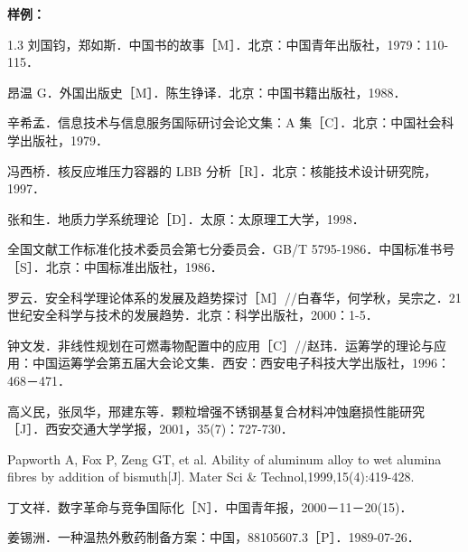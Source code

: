 \documentclass[UTF8, scheme=chinese, openany, oneside]{ctexbook}
\begin{document}
\noindent {}\textbf{样例：}

\vspace{0.3cm}
\begin{spacing}{1.3}
\noindent [1] 刘国钧，郑如斯．中国书的故事［M］．北京：中国青年出版社，1979：110-115．

\vspace{0.2cm}
\noindent [2] 昂温 G．外国出版史［M］．陈生铮译．北京：中国书籍出版社，1988．

\vspace{0.2cm}
\noindent [3] 辛希孟．信息技术与信息服务国际研讨会论文集：A 集［C］．北京：中国社会科学出版社，1979．

\vspace{0.2cm}
\noindent [4] 冯西桥．核反应堆压力容器的 LBB 分析［R］．北京：核能技术设计研究院，1997．

\vspace{0.2cm}
\noindent [5] 张和生．地质力学系统理论［D］．太原：太原理工大学，1998．

\vspace{0.2cm}
\noindent [6] 全国文献工作标准化技术委员会第七分委员会．GB/T 5795-1986．中国标准书号［S］．北京：中国标准出版社，1986．

\vspace{0.2cm}
\noindent [7] 罗云．安全科学理论体系的发展及趋势探讨［M］//白春华，何学秋，吴宗之．21世纪安全科学与技术的发展趋势．北京：科学出版社，2000：1-5．

\vspace{0.2cm}
\noindent [8] 钟文发．非线性规划在可燃毒物配置中的应用［C］//赵玮．运筹学的理论与应用：中国运筹学会第五届大会论文集．西安：西安电子科技大学出版社，1996：468－471．

\vspace{0.2cm}
\noindent [9] 高义民，张凤华，邢建东等．颗粒增强不锈钢基复合材料冲蚀磨损性能研究［J］．西安交通大学学报，2001，35(7)：727-730．

\vspace{0.2cm}
\noindent [10] Papworth A, Fox P, Zeng GT, et al. Ability of aluminum alloy to wet alumina fibres by addition of bismuth[J]. Mater Sci \& Technol,1999,15(4):419-428.

\vspace{0.2cm}
\noindent [11] 丁文祥．数字革命与竞争国际化［N］．中国青年报，2000－11－20(15)．

\vspace{0.2cm}
\noindent [12] 姜锡洲．一种温热外敷药制备方案：中国，88105607.3［P］．1989-07-26．


\end{spacing}
\end{document}
